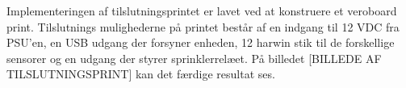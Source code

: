 Implementeringen af tilslutningsprintet er lavet ved at konstruere et veroboard print. Tilslutnings mulighederne på printet består af en indgang til 12 VDC fra PSU'en, en USB udgang der forsyner enheden, 12 harwin stik til de forskellige sensorer og en udgang der styrer sprinklerrelæet. På billedet [BILLEDE AF TILSLUTNINGSPRINT] kan det færdige resultat ses.  


